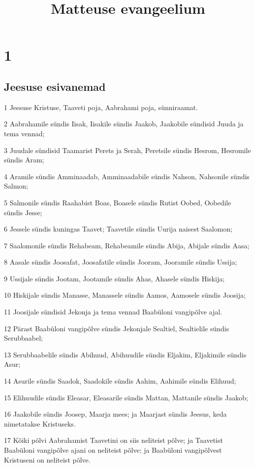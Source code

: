 

\title{Matteuse evangeelium}

\chapter{1}

\section*{Jeesuse esivanemad}

\par 1 Jeesuse Kristuse, Taaveti poja, Aabrahami poja, sünniraamat.
\par 2 Aabrahamile sündis Iisak, Iisakile sündis Jaakob, Jaakobile sündisid Juuda ja tema vennad;
\par 3 Juudale sündisid Taamarist Perets ja Serah, Peretsile sündis Hesrom, Hesromile sündis Aram;
\par 4 Aramile sündis Amminaadab, Amminaadabile sündis Nahson, Nahsonile sündis Salmon;
\par 5 Salmonile sündis Raahabist Boas, Boasele sündis Rutist Oobed, Oobedile sündis Jesse;
\par 6 Jessele sündis kuningas Taavet; Taavetile sündis Uurija naisest Saalomon;
\par 7 Saalomonile sündis Rehabeam, Rehabeamile sündis Abija, Abijale sündis Aasa;
\par 8 Aasale sündis Joosafat, Joosafatile sündis Jooram, Jooramile sündis Ussija;
\par 9 Ussijale sündis Jootam, Jootamile sündis Ahas, Ahasele sündis Hiskija;
\par 10 Hiskijale sündis Manasse, Manassele sündis Aamos, Aamosele sündis Joosija;
\par 11 Joosijale sündisid Jekonja ja tema vennad Baabüloni vangipõlve ajal.
\par 12 Pärast Baabüloni vangipõlve sündis Jekonjale Sealtiel, Sealtielile sündis Serubbaabel;
\par 13 Serubbaabelile sündis Abihuud, Abihuudile sündis Eljakim, Eljakimile sündis Asur;
\par 14 Asurile sündis Saadok, Saadokile sündis Aahim, Aahimile sündis Elihuud;
\par 15 Elihuudile sündis Eleasar, Eleasarile sündis Mattan, Mattanile sündis Jaakob;
\par 16 Jaakobile sündis Joosep, Maarja mees; ja Maarjast sündis Jeesus, keda nimetatakse Kristuseks.
\par 17 Kõiki põlvi Aabrahamist Taavetini on siis neliteist põlve; ja Taavetist Baabüloni vangipõlve ajani on neliteist põlve; ja Baabüloni vangipõlvest Kristuseni on neliteist põlve.

